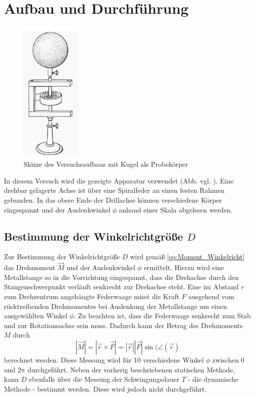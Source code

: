 \section{Aufbau und Durchführung} %
\label{sec:durchfhrung}
\begin{figure}[h]
	\label{fig:drillachse}
	\centering
	\includegraphics[height=7cm]{Bilder/drillachse}
	\caption{Skizze des Versuchsaufbaus mit Kugel als Probekörper}
\end{figure}
In diesem Versuch wird die gezeigte Apparatur verwendet (Abb. vgl. \cite{V101}). 
Eine drehbar gelagerte Achse ist über eine Spiralfeder an einen festen Rahmen gebunden. 
In das obere Ende der Drillachse können verschiedene Körper eingespannt und der Auslenkwinkel $\phi$ anhand einer Skala abgelesen werden.
\subsection{Bestimmung der Winkelrichtgröße $D$}
\label{subsec:winkelricht}
Zur Bestimmung der Winkelrichtgröße $D$ wird gemäß \eqref{eq:Moment_Winkelricht} das Drehmoment $\vec{M}$ und der Auslenkwinkel $\phi$ ermittelt. Hierzu wird eine Metallstange so in die Vorrichtung eingespannt, 
dass die Drehachse durch den Stangenschwerpunkt verläuft senkrecht zur Drehachse steht.
Eine im Abstand $r$ zum Drehzentrum angehängte Federwaage misst die Kraft $F$ ausgehend vom rücktreibenden Drehmomentes bei Auslenkung der Metallstange um einen ausgewählten Winkel $\phi$. 
Zu beachten ist, dass die Federwaage senkrecht zum Stab und zur Rotationsachse sein muss. 
Dadurch kann der Betrag des Drehmoments $M$ durch
\begin{equation}
	| \vec{M} | = | \vec{r} \times \vec{F} | = |\vec{r}| |\vec{F}| \sin (\angle({\vec{r}})
\end{equation}
berechnet werden.
Diese Messung wird für 10 verschiedene Winkel $\phi$ zwischen 0 und $2\mathup{\pi}$ durchgeführt. Neben der vorherig beschriebenen statischen Methode, kann $D$ ebenfalls über die Messung der Schwingungsdauer $T$ - die dynamische Methode - bestimmt werden. Diese wird jedoch nicht durchgeführt.

